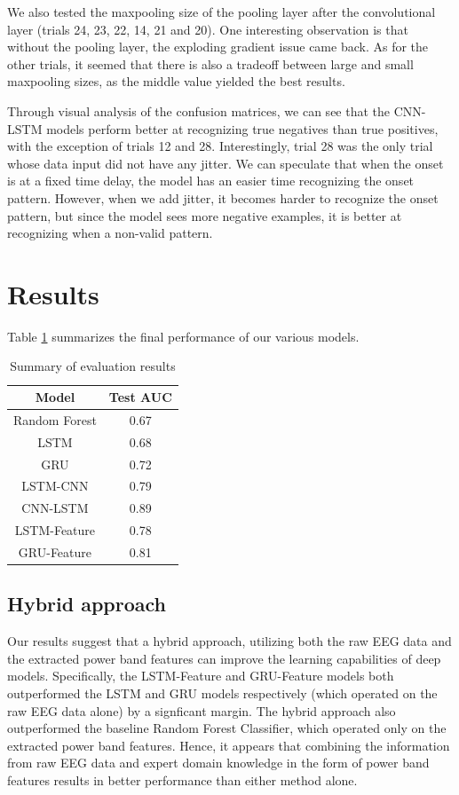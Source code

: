 \documentclass[format=sigconf, nonacm=true, review=true, screen=true]{acmart}
\begin{document}
We also tested the maxpooling size of the pooling layer after the convolutional layer (trials 24, 23, 22, 14, 21 and 20). One interesting observation is that without the pooling layer, the exploding gradient issue came back. As for the other trials, it seemed that there is also a tradeoff between large and small maxpooling sizes, as the middle value yielded the best results.

Through visual analysis of the confusion matrices, we can see that the CNN-LSTM models perform better at recognizing true negatives than true positives, with the exception of trials 12 and 28. Interestingly, trial 28 was the only trial whose data input did not have any jitter. We can speculate that when the onset is at a fixed time delay, the model has an easier time recognizing the onset pattern. However, when we add jitter, it becomes harder to recognize the onset pattern, but since the model sees more negative examples, it is better at recognizing when a non-valid pattern.

\section{Results}
Table \ref{tab:result-summary} summarizes the final performance of our various models.
\begin{table}[H]
  \caption{Summary of evaluation results}
  \label{tab:result-summary}
  \begin{tabular}{cc}
    \toprule
    Model & Test AUC\\
    \midrule
    Random Forest & 0.67\\
    LSTM & 0.68\\
    GRU & 0.72\\
    LSTM-CNN & 0.79\\
    CNN-LSTM & 0.89\\
    LSTM-Feature & 0.78\\
    GRU-Feature & 0.81\\
  \bottomrule
\end{tabular}
\end{table}

\subsection{Hybrid approach}
Our results suggest that a hybrid approach, utilizing both the raw EEG data and the extracted power band features can improve the learning capabilities of deep models. Specifically, the LSTM-Feature and GRU-Feature models both outperformed the LSTM and GRU models respectively (which operated on the raw EEG data alone) by a signficant margin. The hybrid approach also outperformed the baseline Random Forest Classifier, which operated only on the extracted power band features. Hence, it appears that combining the information from raw EEG data and expert domain knowledge in the form of power band features results in better performance than either method alone.
\end{document}
